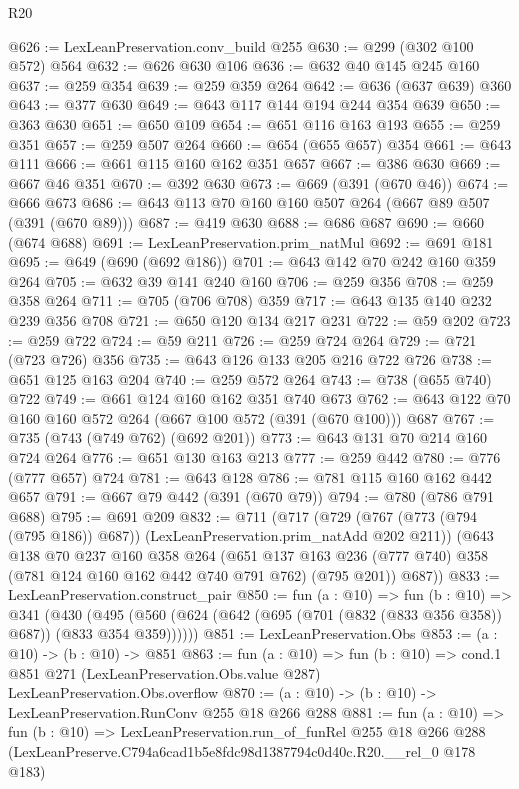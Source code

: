 \begin{lexlean}{R20}
\begin{coremodule}
@626 := LexLeanPreservation.conv_build @255
@630 := @299 (@302 @100 @572) @564
@632 := @626 @630 @106
@636 := @632 @40 @145 @245 @160
@637 := @259 @354
@639 := @259 @359 @264
@642 := @636 (@637 @639) @360
@643 := @377 @630
@649 := @643 @117 @144 @194 @244 @354 @639
@650 := @363 @630
@651 := @650 @109
@654 := @651 @116 @163 @193
@655 := @259 @351
@657 := @259 @507 @264
@660 := @654 (@655 @657) @354
@661 := @643 @111
@666 := @661 @115 @160 @162 @351 @657
@667 := @386 @630
@669 := @667 @46 @351
@670 := @392 @630
@673 := @669 (@391 (@670 @46))
@674 := @666 @673
@686 := @643 @113 @70 @160 @160 @507 @264 (@667 @89 @507 (@391 (@670 @89)))
@687 := @419 @630
@688 := @686 @687
@690 := @660 (@674 @688)
@691 := LexLeanPreservation.prim_natMul
@692 := @691 @181
@695 := @649 (@690 (@692 @186))
@701 := @643 @142 @70 @242 @160 @359 @264
@705 := @632 @39 @141 @240 @160
@706 := @259 @356
@708 := @259 @358 @264
@711 := @705 (@706 @708) @359
@717 := @643 @135 @140 @232 @239 @356 @708
@721 := @650 @120 @134 @217 @231
@722 := @59 @202
@723 := @259 @722
@724 := @59 @211
@726 := @259 @724 @264
@729 := @721 (@723 @726) @356
@735 := @643 @126 @133 @205 @216 @722 @726
@738 := @651 @125 @163 @204
@740 := @259 @572 @264
@743 := @738 (@655 @740) @722
@749 := @661 @124 @160 @162 @351 @740 @673
@762 := @643 @122 @70 @160 @160 @572 @264 (@667 @100 @572 (@391 (@670 @100))) @687
@767 := @735 (@743 (@749 @762) (@692 @201))
@773 := @643 @131 @70 @214 @160 @724 @264
@776 := @651 @130 @163 @213
@777 := @259 @442
@780 := @776 (@777 @657) @724
@781 := @643 @128
@786 := @781 @115 @160 @162 @442 @657
@791 := @667 @79 @442 (@391 (@670 @79))
@794 := @780 (@786 @791 @688)
@795 := @691 @209
@832 := @711
    (@717
      (@729 (@767 (@773 (@794 (@795 @186)) @687)) (LexLeanPreservation.prim_natAdd @202 @211))
      (@643
        @138
        @70
        @237
        @160
        @358
        @264
        (@651 @137 @163 @236 (@777 @740) @358 (@781 @124 @160 @162 @442 @740 @791 @762) (@795 @201))
        @687))
@833 := LexLeanPreservation.construct_pair
@850 := fun (a : @10) =>
  fun (b : @10) =>
  @341
    (@430 (@495 (@560 (@624 (@642 (@695 (@701 (@832 (@833 @356 @358)) @687)) (@833 @354 @359))))))
@851 := LexLeanPreservation.Obs
@853 := (a : @10) -> (b : @10) -> @851
@863 := fun (a : @10) =>
  fun (b : @10) =>
  cond.{1} @851 @271 (LexLeanPreservation.Obs.value @287) LexLeanPreservation.Obs.overflow
@870 := (a : @10) -> (b : @10) -> LexLeanPreservation.RunConv @255 @18 @266 @288
@881 := fun (a : @10) =>
  fun (b : @10) =>
  LexLeanPreservation.run_of_funRel
    @255
    @18
    @266
    @288
    (LexLeanPreserve.C794a6cad1b5e8fdc98d1387794c0d40c.R20.__rel_0 @178 @183)
\end{coremodule}
\end{lexlean}
